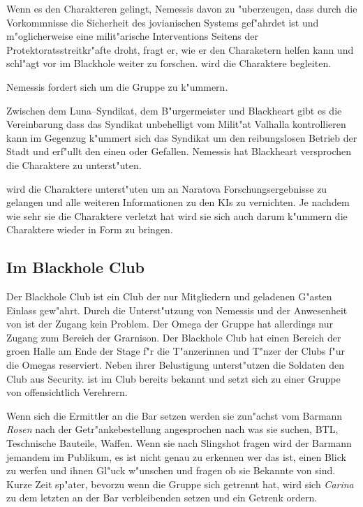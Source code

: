 Wenn es den Charakteren gelingt, Nemessis davon zu "uberzeugen, dass durch die Vorkommnisse die Sicherheit des jovianischen Systems gef"ahrdet ist und m"oglicherweise eine milit"arische Interventions Seitens der Protektoratsstreitkr"afte droht, fragt er, wie er den Charaketern helfen kann und schl"agt vor im Blackhole weiter zu forschen. \xl{} wird die Charaktere begleiten.

Nemessis fordert \xl{} sich um die Gruppe zu k"ummern.

\begin{remarks}
	Zwischen dem Luna--Syndikat, dem B"urgermeister und Blackheart gibt es die Vereinbarung dass das Syndikat unbehelligt vom Milit"at Valhalla kontrollieren kann im Gegenzug k"ummert sich das Syndikat um den reibungslosen Betrieb der Stadt und erf"ullt den einen oder Gefallen. Nemessis hat Blackheart versprochen die Charaktere zu unterst"uten.

	\xl{} wird die Charaktere unterst"uten um an Naratova Forschungsergebnisse zu gelangen und alle weiteren Informationen zu den KIs zu vernichten. Je nachdem wie sehr sie die Charaktere verletzt hat wird sie sich auch darum k"ummern die Charaktere wieder in Form zu bringen.
\end{remarks}

\subsection{Im Blackhole Club}

Der Blackhole Club ist ein Club der nur Mitgliedern und geladenen G"asten Einlass gew"ahrt. Durch die Unterst"utzung von Nemessis und der Anwesenheit von \xl{} ist der Zugang kein Problem. Der Omega der Gruppe hat allerdings nur Zugang zum Bereich der Grarnison. Der Blackhole Club hat einen Bereich der gro\3en Halle am Ende der Stage f"r die T"anzerinnen und T"nzer der Clubs f"ur die Omegas reserviert. Neben ihrer Belustigung unterst"utzen die Soldaten den Club aus Security. \xl{} ist im Club bereits bekannt und setzt sich zu einer Gruppe von offensichtlich Verehrern.

Wenn sich die Ermittler an die Bar setzen werden sie zun"achst vom Barmann \emph{Rosen} nach der Getr"ankebestellung angesprochen nach was sie suchen, BTL, Teschnische Bauteile, Waffen. Wenn sie nach Slingshot fragen wird der Barmann jemandem im Publikum, es ist nicht genau zu erkennen wer das ist, einen Blick zu werfen und ihnen Gl"uck w"unschen und fragen ob sie Bekannte von \xl{} sind. Kurze Zeit sp"ater, bevorzu wenn die Gruppe sich getrennt hat, wird sich \emph{Carina} zu dem letzten an der Bar verbleibenden setzen und ein Getrenk ordern.


